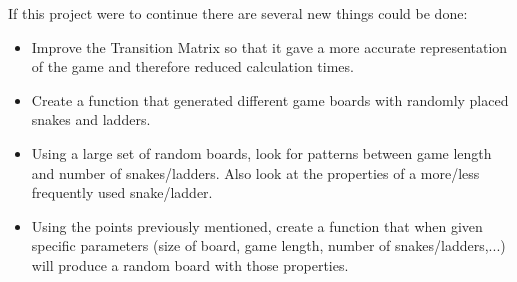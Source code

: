 \documentclass[a4paper]{article}
\begin{document}
If this project were to continue there are several new things could be done:
\begin{itemize}
    \item Improve the Transition Matrix so that it gave a more accurate representation of the game and therefore reduced calculation times.
    \item Create a function that generated different game boards with randomly placed snakes and ladders.
    \item Using a large set of random boards, look for patterns between game length and number of snakes/ladders. Also look at the properties of a more/less frequently used snake/ladder.
    \item Using the points previously mentioned, create a function that when given specific parameters (size of board, game length, number of snakes/ladders,...) will produce a random board with those properties.
\end{itemize}



\end{document}
